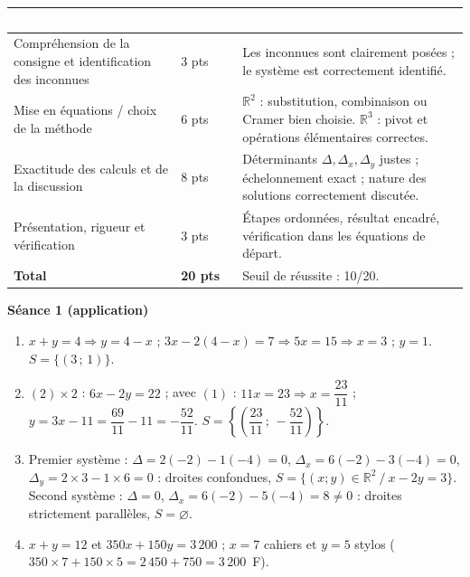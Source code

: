 \documentclass[a4paper,11pt]{article}
\begin{document}
\vspace{6pt}
\noindent
\begin{tabularx}{\textwidth}{|p{5.4cm}|p{3.0cm}|X|}
\hline
\rowcolor{entete}
\textcolor{white}{\textbf{Critères d'évaluation}} &
\textcolor{white}{\textbf{Barème}} &
\textcolor{white}{\textbf{Indicateurs de réussite}}\\
\hline
Compréhension de la consigne et identification des inconnues & 3 pts &
Les inconnues sont clairement posées ; le système est correctement identifié. \\
\hline
Mise en équations / choix de la méthode & 6 pts &
$\mathbb{R}^2$ : substitution, combinaison ou Cramer bien choisie. $\mathbb{R}^3$ : pivot et opérations élémentaires correctes. \\
\hline
Exactitude des calculs et de la discussion & 8 pts &
Déterminants $\Delta,\Delta_x,\Delta_y$ justes ; échelonnement exact ; nature des solutions correctement discutée. \\
\hline
Présentation, rigueur et vérification & 3 pts &
Étapes ordonnées, résultat encadré, vérification dans les équations de départ. \\
\hline
\rowcolor{fond} \textbf{Total} & \textbf{20 pts} & Seuil de réussite : 10/20. \\
\hline
\end{tabularx}

\vspace{10pt}

\vspace{4pt}
\noindent\textbf{Séance 1 (application)}
\begin{enumerate}[leftmargin=*, itemsep=3pt]
  \item $x+y=4 \Rightarrow y=4-x$ ; $3x-2(4-x)=7 \Rightarrow 5x=15 \Rightarrow x=3$ ; $y=1$. \quad $S=\{(3\,;\,1)\}$.
  \item $(2)\times2$ : $6x-2y=22$ ; avec $(1)$ : $11x=23 \Rightarrow x=\dfrac{23}{11}$ ;
        $y=3x-11=\dfrac{69}{11}-11=-\dfrac{52}{11}$. \quad $S=\left\{\left(\dfrac{23}{11}\,;\,-\dfrac{52}{11}\right)\right\}$.
  \item Premier système : $\Delta=2(-2)-1(-4)=0$, $\Delta_x=6(-2)-3(-4)=0$,
        $\Delta_y=2\times3-1\times6=0$ : droites confondues,
        $S=\{(x;y)\in\mathbb{R}^2 \ /\ x-2y=3\}$.
        Second système : $\Delta=0$, $\Delta_x=6(-2)-5(-4)=8\neq0$ : droites
        strictement parallèles, $S=\varnothing$.
  \item $x+y=12$ et $350x+150y=3\,200$ ; $x=7$ cahiers et $y=5$ stylos
        ($350\times7+150\times5=2\,450+750=3\,200$~F).
\end{enumerate}
\end{document}
